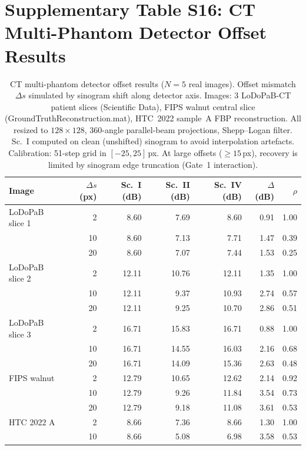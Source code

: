 \documentclass[11pt]{article}
\theoremstyle{definition}
\begin{document}
\section{Supplementary Table S16: CT Multi-Phantom Detector Offset Results}
\label{sec:cbct_scenes}

\begin{table}[htbp]
\centering
\caption{CT multi-phantom detector offset results ($N{=}5$ real images). Offset mismatch $\Delta s$ simulated by sinogram shift along detector axis.
Images: 3 LoDoPaB-CT patient slices (Scientific Data), FIPS walnut central slice (GroundTruthReconstruction.mat), HTC~2022 sample~A FBP reconstruction.
All resized to $128 \times 128$, 360-angle parallel-beam projections, Shepp--Logan filter.
Sc.~I computed on clean (unshifted) sinogram to avoid interpolation artefacts.
Calibration: 51-step grid in $[-25, 25]$\,px.
At large offsets ($\geq 15$\,px), recovery is limited by sinogram edge truncation (Gate~1 interaction).}
\label{tab:cbct_scenes}
\small
\begin{tabular}{l r r r r r r}
\toprule
Image & $\Delta s$ (px) & Sc.~I (dB) & Sc.~II (dB) & Sc.~IV (dB) & $\Delta$(dB) & $\rho$ \\
\midrule
LoDoPaB slice 1 &  2 &  8.60 &  7.69 &  8.60 & 0.91 & 1.00 \\
                & 10 &  8.60 &  7.13 &  7.71 & 1.47 & 0.39 \\
                & 20 &  8.60 &  7.07 &  7.44 & 1.53 & 0.25 \\
LoDoPaB slice 2 &  2 & 12.11 & 10.76 & 12.11 & 1.35 & 1.00 \\
                & 10 & 12.11 &  9.37 & 10.93 & 2.74 & 0.57 \\
                & 20 & 12.11 &  9.25 & 10.70 & 2.86 & 0.51 \\
LoDoPaB slice 3 &  2 & 16.71 & 15.83 & 16.71 & 0.88 & 1.00 \\
                & 10 & 16.71 & 14.55 & 16.03 & 2.16 & 0.68 \\
                & 20 & 16.71 & 14.09 & 15.36 & 2.63 & 0.48 \\
FIPS walnut     &  2 & 12.79 & 10.65 & 12.62 & 2.14 & 0.92 \\
                & 10 & 12.79 &  9.26 & 11.84 & 3.54 & 0.73 \\
                & 20 & 12.79 &  9.18 & 11.08 & 3.61 & 0.53 \\
HTC 2022 A      &  2 &  8.66 &  7.36 &  8.66 & 1.30 & 1.00 \\
                & 10 &  8.66 &  5.08 &  6.98 & 3.58 & 0.53 \\

\end{tabular}
\end{table}
\end{document}
